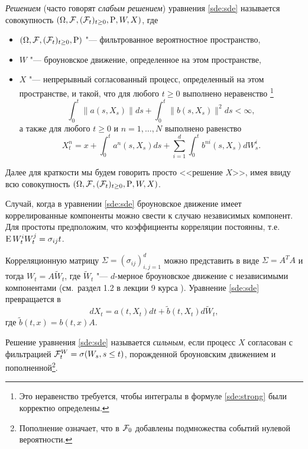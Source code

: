 \begin{definition}
\emph{Решением} (часто говорят \emph{слабым решением}) уравнения \eqref{sde:sde} называется совокупность $(\Omega,\mathcal{F},(\mathcal{F}_t)_{t\ge0},\mathrm{P},W,X)$, где
\begin{itemize}
\item $(\Omega,\mathcal{F},(\mathcal{F}_t)_{t\ge0},\mathrm{P})$ "--- фильтрованное вероятностное пространство,
\item $W$ "--- броуновское движение, определенное на этом пространстве,
\item $X$ "--- непрерывный согласованный процесс, определенный на этом пространстве, и такой, что для любого $t\ge 0$ выполнено неравенство%
\footnote{Это неравенство требуется, чтобы интегралы в формуле \eqref{sde:strong} были корректно определены.}
\begin{equation}
\label{sde:strong-ineq}
\int_0^t \|a(s,X_s)\|ds + \int_0^t \|b(s,X_s)\|^2ds < \infty,
\end{equation}
а также для любого $t\ge 0$ и $n=1,\dots,N$ выполнено равенство
\begin{equation}
\label{sde:strong}
X_t^n = x + \int_0^t a^n(s,X_s)ds + \sum_{i=1}^d\int_0^t b^{ni}(s,X_s)dW_s^i.
\end{equation}
\end{itemize}
\end{definition}

Далее для краткости мы будем говорить просто <<решение $X$>>, имея ввиду всю совокупность $(\Omega,\mathcal{F},(\mathcal{F}_t)_{t\ge0},\mathrm{P},W,X)$.

\begin{remark}
\label{sde:r:decorrelate}
Случай, когда в уравнении \eqref{sde:sde} броуновское движение имеет коррелированные компоненты можно свести к случаю независимых компонент.
Для простоты предположим, что коэффициенты корреляции постоянны, т.е. $\operatorname{E} W_t^i W_t^j = \sigma_{ij} t$.

Корреляционную матрицу $\Sigma = (\sigma_{ij})_{i,j=1}^d$ можно представить в виде $\Sigma = A^TA$ и тогда $W_t = A \tilde W_t$, где $\tilde W_t$ "--- $d$-мерное броуновское движение с независимыми компонентами (см.~раздел 1.2 в лекции 9 курса \intro).
Уравнение \eqref{sde:sde} превращается в
\[
d X_t = a(t,X_t) dt + \tilde b(t,X_t) d\tilde W_t,
\]
где $\tilde b(t,x) = b(t,x)A$.
\end{remark}

\begin{definition}
Решение уравнения \eqref{sde:sde} называется \emph{сильным}, если процесс $X$ согласован с фильтрацией $\mathcal{F}_t^W = \sigma(W_s, s\le t)$, порожденной броуновским движением и пополненной\footnote{Пополнение означает, что в $\mathcal{F}_0$ добавлены подмножества событий нулевой вероятности.}.
\end{definition}

